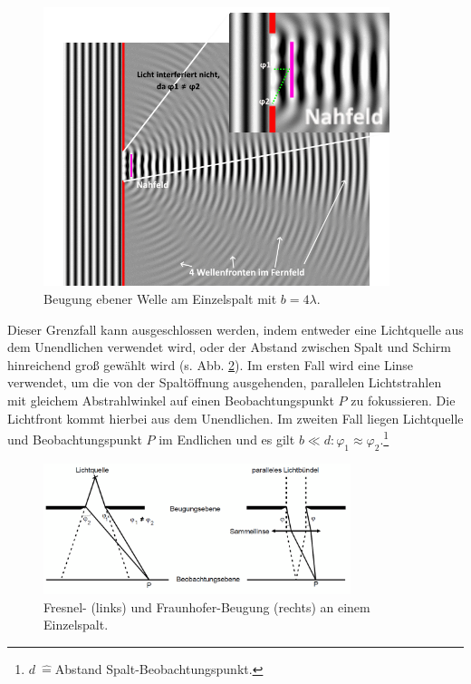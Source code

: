 \begin{figure}
    \centering
    \includegraphics[width=0.9\textwidth]{plots/Wave_Diffraction_4Lambda_Slit.png}
    \caption{Beugung ebener Welle am Einzelspalt mit $b = 4\lambda$.\protect\footnotemark\:\cite{OptischerspaltWiki}}        %
    \label{fig:waveDiff}
\end{figure}

Dieser Grenzfall kann ausgeschlossen werden, indem entweder eine Lichtquelle aus dem Unendlichen verwendet wird, oder der Abstand zwischen Spalt und Schirm hinreichend groß gewählt wird (s. Abb. \ref{fig:fresnelFraunhofer}).
Im ersten Fall wird eine Linse verwendet, um die von der Spaltöffnung ausgehenden, parallelen Lichtstrahlen mit gleichem Abstrahlwinkel auf einen Beobachtungspunkt $P$ zu fokussieren. Die Lichtfront kommt hierbei aus dem Unendlichen.
Im zweiten Fall liegen Lichtquelle und Beobachtungspunkt $P$ im Endlichen und es gilt $b \ll d : \varphi_1 \approx \varphi_2$.\:\footnote{$d\:\hat{=} $Abstand Spalt-Beobachtungspunkt.}

\begin{figure}
    \centering
    \includegraphics[width=0.8\textwidth]{plots/Fresnel_Fraunhofer.png}
    \caption{Fresnel- (links) und Fraunhofer-Beugung (rechts) an einem Einzelspalt.\protect\footnotemark}
    \label{fig:fresnelFraunhofer}
\end{figure}

